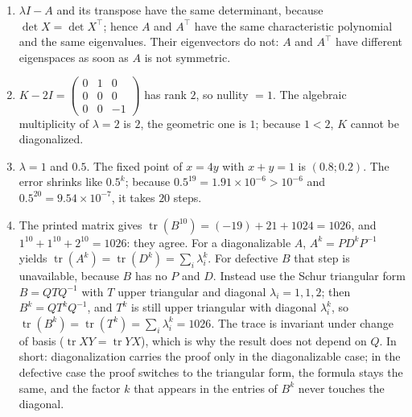 \begin{enumerate}[label=\textbf{9.\arabic*}]
  \item $\lambda I-A$ and its transpose have the same determinant, because
        $\det X=\det X^{\top}$; hence $A$ and
        $A^{\top}$ have the same characteristic polynomial and the same eigenvalues.
        Their eigenvectors do not: $A$ and $A^{\top}$ have different eigenspaces as
        soon as $A$ is not symmetric.

  \item $K-2I=\begin{pmatrix}0&1&0\\0&0&0\\0&0&-1\end{pmatrix}$ has rank $2$,
        so nullity $=1$. The algebraic multiplicity of $\lambda=2$ is $2$,
        the geometric one is $1$; because $1<2$, $K$ cannot be diagonalized.

  \item $\lambda=1$ and $0.5$. The fixed point of $x=4y$ with $x+y=1$ is
        $(0.8;0.2)$. The error shrinks like $0.5^{k}$; because
        $0.5^{19}=1.91\times10^{-6}>\allowbreak10^{-6}$ and
        $0.5^{20}=9.54\times10^{-7}$, it takes $20$ steps.

  \item The printed matrix gives
        $\operatorname{tr}(B^{10})=(-19)+21+1024=1026$, and
        $1^{10}+1^{10}+2^{10}=1026$: they agree. For a diagonalizable $A$,
        $A^{k}=PD^{k}P^{-1}$ yields
        $\operatorname{tr}(A^{k})=\operatorname{tr}(D^{k})=\sum_{i}\lambda_{i}^{k}$.
        For defective $B$ that step is unavailable, because $B$ has no $P$ and $D$.
        Instead use the Schur triangular form $B=QTQ^{-1}$ with $T$ upper triangular
        and diagonal $\lambda_{i}=1,1,2$; then $B^{k}=QT^{k}Q^{-1}$, and $T^{k}$ is
        still upper triangular with diagonal $\lambda_{i}^{k}$, so
        $\operatorname{tr}(B^{k})=\operatorname{tr}(T^{k})
        =\sum_{i}\lambda_{i}^{k}=1026$. The trace is invariant under change of basis
        ($\operatorname{tr}XY=\operatorname{tr}YX$), which is why the result does not
        depend on $Q$. In short: diagonalization carries the proof only in the
        diagonalizable case; in the defective case the proof switches to the
        triangular form, the formula stays the same, and the factor $k$ that appears
        in the entries of $B^{k}$ never touches the diagonal.
\end{enumerate}

